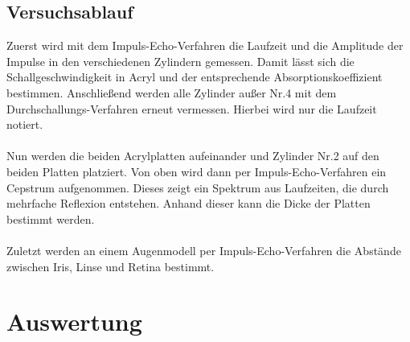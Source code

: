 \documentclass[
  bibliography=totoc,     %
  captions=tableheading,  %
  titlepage=firstiscover, %
]{scrartcl}
\begin{document}
\subsection{Versuchsablauf}
\label{sec:ablauf}
Zuerst wird mit dem Impuls-Echo-Verfahren die Laufzeit und die Amplitude der
Impulse in den verschiedenen Zylindern gemessen. Damit lässt sich die
Schallgeschwindigkeit in Acryl und der entsprechende Absorptionskoeffizient
bestimmen.
Anschließend werden alle Zylinder außer Nr.4 mit dem Durchschallungs-Verfahren
erneut vermessen. Hierbei wird nur die Laufzeit notiert.\\
\\
\noindent
Nun werden die beiden Acrylplatten aufeinander und Zylinder Nr.2 auf den beiden
Platten platziert. Von oben wird dann per Impuls-Echo-Verfahren ein Cepstrum
aufgenommen. Dieses zeigt ein Spektrum aus Laufzeiten, die durch mehrfache
Reflexion entstehen. Anhand dieser kann die Dicke der Platten bestimmt werden.\\
\\
\noindent
Zuletzt werden an einem Augenmodell per Impuls-Echo-Verfahren die Abstände
zwischen Iris, Linse und Retina bestimmt.
\clearpage

\section{Auswertung}
\end{document}
